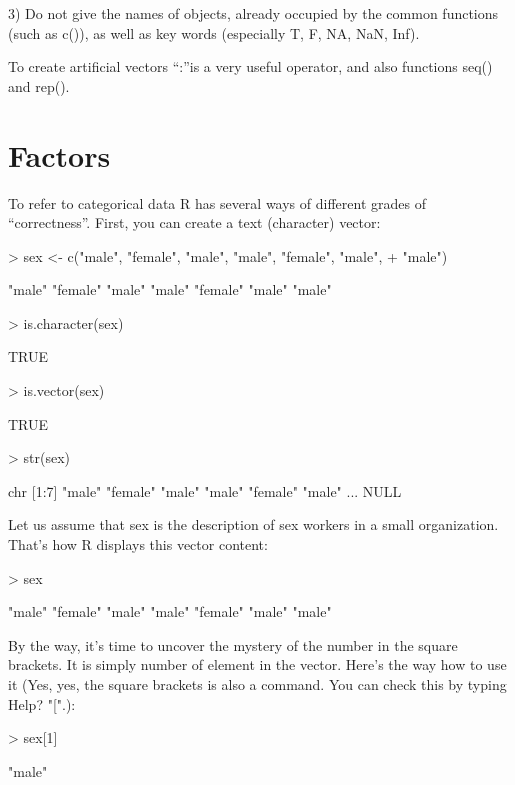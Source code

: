 \documentclass[a4paper,11pt]{scrartcl}
\begin{document}
3) Do not give the names of objects, already occupied by the common functions (such as c()), as well as key words (especially T, F, NA, NaN, Inf).

To create artificial vectors “:”is a very useful operator, and also functions seq() and rep().

\newpage
\section{Factors}
\label{sec:factors}
To refer to categorical data R has several ways of different grades of “correctness”. First, you can create a text (character) vector:


\begin{Schunk}
\begin{Sinput}
> sex <- c("male", "female", "male", "male", "female", "male", 
+     "male")
\end{Sinput}
\begin{Soutput}
[1] "male"   "female" "male"   "male"   "female" "male"   "male"  
\end{Soutput}
\begin{Sinput}
> is.character(sex)
\end{Sinput}
\begin{Soutput}
[1] TRUE
\end{Soutput}
\begin{Sinput}
> is.vector(sex)
\end{Sinput}
\begin{Soutput}
[1] TRUE
\end{Soutput}
\begin{Sinput}
> str(sex)
\end{Sinput}
\begin{Soutput}
 chr [1:7] "male" "female" "male" "male" "female" "male" ...
NULL
\end{Soutput}
\end{Schunk}
Let us assume that sex is the description of sex workers in a small organization. 
That's how R displays this vector content:
\begin{Schunk}
\begin{Sinput}
> sex
\end{Sinput}
\begin{Soutput}
[1] "male"   "female" "male"   "male"   "female" "male"   "male"  
\end{Soutput}
\end{Schunk}
By the way, it's time to uncover the mystery of the number in the square brackets. It is simply number of element in the vector. Here's the way how to use it (Yes, yes, the square brackets is also a command. You can check this by typing Help? "[".):
\begin{Schunk}
\begin{Sinput}
> sex[1]
\end{Sinput}
\begin{Soutput}
[1] "male"
\end{Soutput}
\end{Schunk}
\end{document}
